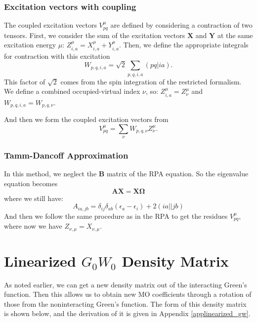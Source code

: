 \documentclass[12pt]{caltech_thesis}
\begin{document}
\subsection{Excitation vectors with coupling}
\label{subsection:coupling}

The coupled excitation vectors $V _{pq}^{\mu }$ are defined 
 by considering a contraction of two tensors. First, we consider the sum of the excitation vectors $\textbf{X}$ and $\textbf{Y}$ at the same excitation energy $\mu$: $Z_{i,a}^{\mu} = X_{i,a}^{\mu} + Y_{i,a}^{\mu}$. Then, we define the appropriate integrals for contraction with this excitation
\begin{equation}
    W_{p,q,i,a} = \sqrt{2} \sum_{p,q,i,a} (pq|ia).
\end{equation}
This factor of $\sqrt{2}$ comes from the spin integration of the restricted formalism.
We define a combined occupied-virtual index $\nu$, so: ${Z}_{i,a}^{\mu} = {Z}_{\nu}^{\mu}$ and ${W}_{p,q,i,a} = {W}_{p,q,\nu}$.

And then we form the coupled excitation vectors from
\begin{equation}
    {V}_{pq}^{\mu} = \sum_{\nu} {W}_{p,q,\nu} {Z}_{\nu}^{\mu}.
\end{equation}

\subsection{Tamm-Dancoff Approximation}
In this method, we neglect the $\textbf{B}$ matrix of the RPA equation. So the eigenvalue equation becomes
\begin{equation}
    \textbf{A}\textbf{X} = \textbf{X} \boldsymbol{\Omega }
\end{equation}
where we still have:
\begin{equation}
    A_{ia,jb} = \delta _{ij}\delta _{ab}(\epsilon_{a}- \epsilon_{i}) + 2(ia||jb)
\label{eq: A matrix TDA}
\end{equation}
And then we follow the same procedure as in the RPA to get the residues $V_{pq}^{\mu}$, where now we have ${Z}_{\nu, \mu} = {X}_{\nu, \mu}$.

\chapter{Linearized $G_0W_0$ Density Matrix}
As noted earlier, we can get a new density matrix out of the interacting Green's function. Then this allows us to obtain new MO coefficients through a rotation of those from the noninteracting Green's function. The form of this density matrix is shown below, and the derivation of it is given in Appendix \ref{applinearized_gw}.
\label{chap:linearized_gw}
\end{document}
